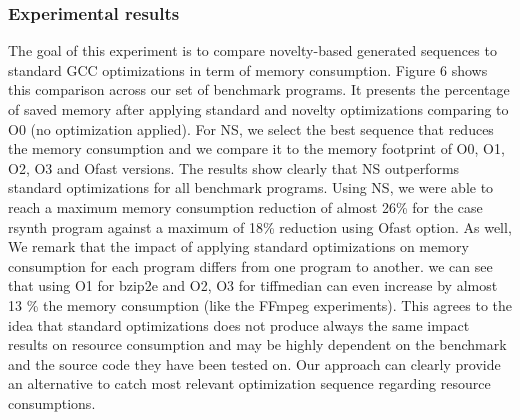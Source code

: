 \subsubsection{Experimental results}
The goal of this experiment is to compare novelty-based generated sequences to standard GCC optimizations in term of memory consumption. Figure 6 shows this comparison across our set of benchmark programs. It presents the percentage of saved memory after applying standard and novelty optimizations comparing to O0 (no optimization applied).
For NS, we select the best sequence that reduces the memory consumption and we compare it to the memory footprint of O0, O1, O2, O3 and Ofast versions. The results show clearly that NS outperforms standard optimizations for all benchmark programs. Using NS, we were able to reach a maximum memory consumption reduction of almost 26\% for the case rsynth program against a maximum of 18\% reduction using Ofast option. As well, We remark that the impact of applying standard optimizations on memory consumption for each program differs from one program to another. we can see that using O1 for bzip2e and O2, O3 for tiffmedian can even increase by almost 13 \% the memory consumption (like the FFmpeg experiments). This agrees to the idea that standard optimizations does not produce always the same impact results on resource consumption and may be highly dependent on the benchmark and the source code they have been tested on. Our approach can clearly provide an alternative to catch most relevant optimization sequence regarding resource consumptions.


